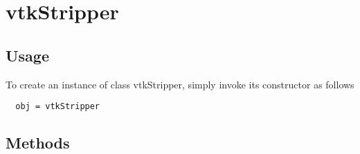 \section{vtkStripper}

\subsection{Usage}


To create an instance of class vtkStripper, simply
invoke its constructor as follows
\begin{verbatim}
  obj = vtkStripper
\end{verbatim}
\subsection{Methods}

